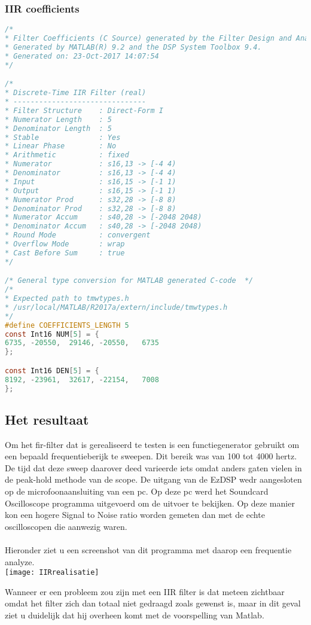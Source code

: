 \subsubsection{IIR coefficients}
\begin{lstlisting}[language=c]
/*
* Filter Coefficients (C Source) generated by the Filter Design and Analysis Tool
* Generated by MATLAB(R) 9.2 and the DSP System Toolbox 9.4.
* Generated on: 23-Oct-2017 14:07:54
*/

/*
* Discrete-Time IIR Filter (real)
* -------------------------------
* Filter Structure    : Direct-Form I
* Numerator Length    : 5
* Denominator Length  : 5
* Stable              : Yes
* Linear Phase        : No
* Arithmetic          : fixed
* Numerator           : s16,13 -> [-4 4)
* Denominator         : s16,13 -> [-4 4)
* Input               : s16,15 -> [-1 1)
* Output              : s16,15 -> [-1 1)
* Numerator Prod      : s32,28 -> [-8 8)
* Denominator Prod    : s32,28 -> [-8 8)
* Numerator Accum     : s40,28 -> [-2048 2048)
* Denominator Accum   : s40,28 -> [-2048 2048)
* Round Mode          : convergent
* Overflow Mode       : wrap
* Cast Before Sum     : true
*/

/* General type conversion for MATLAB generated C-code  */
/* 
* Expected path to tmwtypes.h 
* /usr/local/MATLAB/R2017a/extern/include/tmwtypes.h 
*/
#define COEFFICIENTS_LENGTH 5
const Int16 NUM[5] = {
6735, -20550,  29146, -20550,   6735
};

const Int16 DEN[5] = {
8192, -23961,  32617, -22154,   7008
};	   
\end{lstlisting}
\clearpage

\subsection{Het resultaat}	
    Om het fir-filter dat is gerealiseerd te testen is een functiegenerator gebruikt om een bepaald frequentieberijk te sweepen. Dit bereik was van 100 tot 4000 hertz. De tijd dat deze sweep daarover deed varieerde iets omdat anders gaten vielen in de peak-hold methode van de scope. De uitgang van de EzDSP wedr aangesloten op de microfoonaansluiting van een pc. Op deze pc werd het Soundcard Oscilloscope programma uitgevoerd om de uitvoer te bekijken. Op deze manier kon een hogere Signal to Noise ratio worden gemeten dan met de echte oscilloscopen die aanwezig waren. 
    \\\\Hieronder ziet u een screenshot van dit programma met daarop een frequentie analyze.
    \\\texttt{[image: IIRrealisatie]}\par\vspace{1cm}
    Wanneer er een probleem zou zijn met een IIR filter is dat meteen zichtbaar omdat het filter zich dan totaal niet gedraagd zoals gewenst is, maar in dit geval ziet u duidelijk dat hij overheen komt met de voorspelling van Matlab.
    
\clearpage